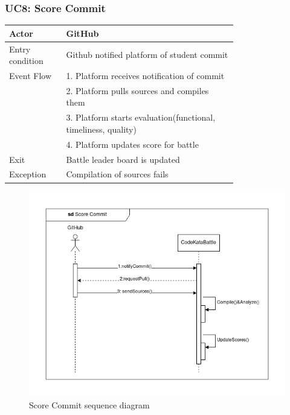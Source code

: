 \subsubsection{UC8: Score Commit}
\begin{center}
    \begin{longtable}{lp{0.75\linewidth}}
        \hline
            Actor & GitHub\\
        \hline
            Entry condition & Github notified platform of student commit\\
        \hline
            Event Flow & 1. Platform receives notification of commit\\
                       & 2. Platform pulls sources and compiles them\\
                       & 3. Platform starts evaluation(functional, timeliness, quality)\\
                       & 4. Platform updates score for battle\\
        \hline
            Exit & Battle leader board is updated\\
        \hline
            Exception & Compilation of sources fails\\
        \hline
    \end{longtable}
\end{center}

\begin{figure}[H]
    \centering
    \includegraphics[width=1\linewidth]{misc//Images//UC Diagrams/UC8.png}
    \caption{Score Commit sequence diagram}
    \label{fig:enter-label}
\end{figure}

